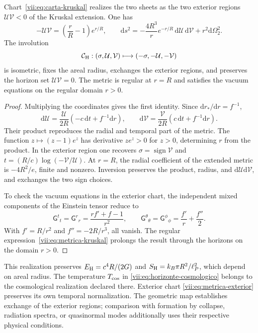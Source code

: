 \begin{theorem}
\label{vii:thm:kruskal-hojas}
Chart~\eqref{vii:eq:carta-kruskal} realizes the two sheets as the
two exterior regions \(\mathcal U\mathcal V<0\) of the
Kruskal extension. One has
\begin{equation}
 -\mathcal U\mathcal V=\left(\frac rR-1\right)e^{r/R},\qquad
 \mathrm ds^2=-\frac{4R^3}{r}e^{-r/R}\,
                    \mathrm d\mathcal U\,\mathrm d\mathcal V
                    +r^2\mathrm d\Omega_2^2.
 \label{vii:eq:metrica-kruskal}
\end{equation}
The involution
\begin{equation}
 \mathcal C_{\rm H}:(\sigma,\mathcal U,\mathcal V)
 \longmapsto(-\sigma,-\mathcal U,-\mathcal V)
 \label{vii:eq:involucion-horizonte}
\end{equation}
is isometric, fixes the areal radius, exchanges the exterior regions, and preserves
the horizon set \(\mathcal U\mathcal V=0\).
The metric is regular at \(r=R\) and satisfies the vacuum equations
on the regular domain \(r>0\).
\end{theorem}
\begin{proof}
Multiplying the coordinates gives the first identity. Since
\(\mathrm dr_*/\mathrm dr=f^{-1}\),
\[
 \mathrm d\mathcal U=\frac{\mathcal U}{2R}
            (-c\,\mathrm dt+f^{-1}\mathrm dr),\qquad
 \mathrm d\mathcal V=\frac{\mathcal V}{2R}
            ( c\,\mathrm dt+f^{-1}\mathrm dr).
\]
Their product reproduces the radial and temporal part of the metric.
The function \(z\mapsto(z-1)e^z\) has derivative \(ze^z>0\)
for \(z>0\), determining \(r\) from the product.
In the exterior region one recovers
\(\sigma=\operatorname{sign}\mathcal V\) and
\(t=(R/c)\log(-\mathcal V/\mathcal U)\).
At \(r=R\), the radial coefficient of the extended metric is
\(-4R^2/e\), finite and nonzero. Inversion preserves the
product, radius, and \(\mathrm d\mathcal U\mathrm d\mathcal V\),
and exchanges the two sign choices.

To check the vacuum equations in the exterior chart, the independent
mixed components of the Einstein tensor reduce to
\[
 \mathsf G^t{}_t=\mathsf G^r{}_r
 =\frac{rf'+f-1}{r^2},\qquad
 \mathsf G^\theta{}_\theta=\mathsf G^\phi{}_\phi
 =\frac{f'}r+\frac{f''}2.
\]
With \(f'=R/r^2\) and \(f''=-2R/r^3\), all vanish.
The regular expression~\eqref{vii:eq:metrica-kruskal} prolongs the
result through the horizons on the domain \(r>0\).
\end{proof}

This realization preserves
\(E_{\rm H}=c^4R/(2G)\) and
\(S_{\rm H}=k_B\pi R^2/\ell_P^2\), which depend on areal radius.
The temperature \(T_{\rm cos}\) in
\eqref{vii:eq:horizonte-cosmologico} belongs to the cosmological
realization declared there. Exterior chart
\eqref{vii:eq:metrica-exterior} preserves its own temporal normalization.
The geometric map establishes exchange of the exterior regions; comparison
with formation by collapse, radiation spectra, or quasinormal modes
additionally uses their respective physical conditions.

